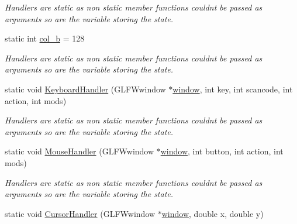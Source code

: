 \begin{DoxyCompactItemize}
\begin{DoxyCompactList}\small\item\em Handlers are static as non static member functions couldn\textquotesingle{}t be passed as arguments so are the variable storing the state. \end{DoxyCompactList}\item 
static int \hyperlink{classcft_1_1Crafter_a69402d955cc6a8ab59ae82f74c52eb88}{col\+\_\+b} = 128\hypertarget{classcft_1_1Crafter_a69402d955cc6a8ab59ae82f74c52eb88}{}\label{classcft_1_1Crafter_a69402d955cc6a8ab59ae82f74c52eb88}

\begin{DoxyCompactList}\small\item\em Handlers are static as non static member functions couldn\textquotesingle{}t be passed as arguments so are the variable storing the state. \end{DoxyCompactList}\item 
static void \hyperlink{classcft_1_1Crafter_a41f99673082ebc4b26b5c844f106a870}{Keyboard\+Handler} (G\+L\+F\+Wwindow $\ast$\hyperlink{classcft_1_1Crafter_a70b8292b32d9eda7b3ce9e8c86161042}{window}, int key, int scancode, int action, int mods)\hypertarget{classcft_1_1Crafter_a41f99673082ebc4b26b5c844f106a870}{}\label{classcft_1_1Crafter_a41f99673082ebc4b26b5c844f106a870}

\begin{DoxyCompactList}\small\item\em Handlers are static as non static member functions couldn\textquotesingle{}t be passed as arguments so are the variable storing the state. \end{DoxyCompactList}\item 
static void \hyperlink{classcft_1_1Crafter_acc54c5bd962b9c7a259a76589052e08e}{Mouse\+Handler} (G\+L\+F\+Wwindow $\ast$\hyperlink{classcft_1_1Crafter_a70b8292b32d9eda7b3ce9e8c86161042}{window}, int button, int action, int mods)\hypertarget{classcft_1_1Crafter_acc54c5bd962b9c7a259a76589052e08e}{}\label{classcft_1_1Crafter_acc54c5bd962b9c7a259a76589052e08e}

\begin{DoxyCompactList}\small\item\em Handlers are static as non static member functions couldn\textquotesingle{}t be passed as arguments so are the variable storing the state. \end{DoxyCompactList}\item 
static void \hyperlink{classcft_1_1Crafter_a95820140f31bbea4f9aa2d70bf2bc9a1}{Cursor\+Handler} (G\+L\+F\+Wwindow $\ast$\hyperlink{classcft_1_1Crafter_a70b8292b32d9eda7b3ce9e8c86161042}{window}, double x, double y)\hypertarget{classcft_1_1Crafter_a95820140f31bbea4f9aa2d70bf2bc9a1}{}\label{classcft_1_1Crafter_a95820140f31bbea4f9aa2d70bf2bc9a1}


\end{DoxyCompactItemize}
